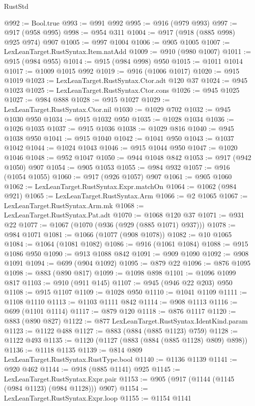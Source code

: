 \begin{lexlean}{RustStd}
\begin{coremodule}
@992 := Bool.true
@993 := @991 @992
@995 := @916 (@979 @993)
@997 := @917 (@958 @995)
@998 := @954 @311
@1004 := @917 (@918 (@885 @998) @925 @974) @907
@1005 := @997 @1004
@1006 := @905 @1005
@1007 := LexLeanTarget.RustSyntax.Item.natAdd
@1009 := @910 (@980 @1007)
@1011 := @915 (@984 @955)
@1014 := @915 (@984 @998) @950
@1015 := @1011 @1014
@1017 := @1009 @1015 @992
@1019 := @916 (@1006 @1017)
@1020 := @915 @1019
@1023 := LexLeanTarget.RustSyntax.Ctor.adt @120 @37
@1024 := @945 @1023
@1025 := LexLeanTarget.RustSyntax.Ctor.cons
@1026 := @945 @1025
@1027 := @984 @888
@1028 := @915 @1027
@1029 := LexLeanTarget.RustSyntax.Ctor.nil
@1030 := @1029 @702
@1032 := @945 @1030 @950
@1034 := @915 @1032 @950
@1035 := @1028 @1034
@1036 := @1026 @1035
@1037 := @915 @1036
@1038 := @1029 @816
@1040 := @945 @1038 @950
@1041 := @915 @1040
@1042 := @1041 @950
@1043 := @1037 @1042
@1044 := @1024 @1043
@1046 := @915 @1044 @950
@1047 := @1020 @1046
@1048 := @952 @1047
@1050 := @944 @1048 @842
@1053 := @917 (@942 @1050) @907
@1054 := @905 @1053
@1055 := @984 @932
@1057 := @916 (@1054 @1055)
@1060 := @917 (@926 @1057) @907
@1061 := @905 @1060
@1062 := LexLeanTarget.RustSyntax.Expr.matchOn
@1064 := @1062 (@984 @921)
@1065 := LexLeanTarget.RustSyntax.Arm
@1066 := @2 @1065
@1067 := LexLeanTarget.RustSyntax.Arm.mk
@1068 := LexLeanTarget.RustSyntax.Pat.adt
@1070 := @1068 @120 @37
@1071 := @931 @22
@1077 := @1067 (@1070 (@936 (@929 (@885 @1071) @937)))
@1078 := @984 @1071
@1081 := @1066 (@1077 (@908 @1078))
@1082 := @10 @1065
@1084 := @1064 (@1081 @1082)
@1086 := @916 (@1061 @1084)
@1088 := @915 @1086 @950
@1090 := @913 @1088 @842
@1091 := @909 @1090
@1092 := @908 @1091
@1094 := @699 (@904 @1092)
@1095 := @879 @22
@1096 := @876 @1095
@1098 := @883 (@890 @817)
@1099 := @1098 @898
@1101 := @1096 @1099 @817
@1103 := @910 (@911 @145)
@1107 := @945 (@946 @22 @203) @950
@1108 := @915 @1107
@1109 := @1028 @950
@1110 := @1041 @1109
@1111 := @1108 @1110
@1113 := @1103 @1111 @842
@1114 := @908 @1113
@1116 := @699 (@1101 @1114)
@1117 := @879 @120
@1118 := @876 @1117
@1120 := @883 (@890 @827)
@1122 := @877 LexLeanTarget.RustSyntax.IdentKind.param
@1123 := @1122 @488
@1127 := @883 (@884 (@885 @1123) @759)
@1128 := @1122 @493
@1135 := @1120 (@1127 (@883 (@884 (@885 @1128) @809) @898))
@1136 := @1118 @1135
@1139 := @814 @809 LexLeanTarget.RustSyntax.RustType.bool
@1140 := @1136 @1139
@1141 := @920 @462
@1144 := @918 (@885 @1141) @925
@1145 := LexLeanTarget.RustSyntax.Expr.pair
@1153 := @905 (@917 (@1144 (@1145 (@984 @1123) (@984 @1128))) @907)
@1154 := LexLeanTarget.RustSyntax.Expr.loop
@1155 := @1154 @1141

\end{coremodule}
\end{lexlean}
